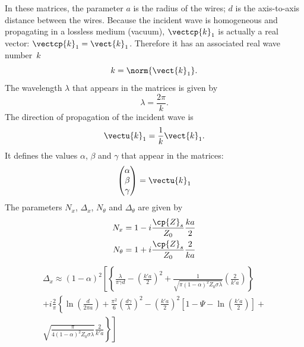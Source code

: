 In these matrices, the parameter $a$ is the radius of the wires;
$d$ is the axis-to-axis distance between the wires.
Because the incident wave is homogeneous and propagating in a lossless medium (vacuum), $\vectcp{k}_1$ is actually a real vector: $\vectcp{k}_1 = \vect{k}_1$.
Therefore it has an associated real wave number~$k$
\begin{equation}
    k = \norm{\vect{k}_1}\text{.}
\end{equation}
The wavelength $\lambda$ that appears in the matrices is given by
\begin{equation}
    \lambda = \frac{2 \pi}{k}
    \text{.}
\end{equation}
The direction of propagation of the incident wave is
\begin{equation}
    \vectu{k}_1 = \frac{1}{k} \vect{k}_1
    \text{.}
\end{equation}
It defines the values $\alpha$, $\beta$ and $\gamma$ that appear in the matrices:
\begin{equation}
    \begin{pmatrix}
    \alpha \\ \beta \\ \gamma
    \end{pmatrix}
    =
    \vectu{k}_1
\end{equation}
The parameters $N_x$, $\Delta_x$, $N_\theta$ and $\Delta_\theta$ are given by
\begin{align}
    N_x
    &=
    1 - i \frac{\cp{Z}_s}{Z_0} \frac{ka}{2}
    \\
    N_\theta
    &=
    1 + i \frac{\cp{Z}_s}{Z_0} \frac{2}{ka}
\end{align}
\begin{multline}
    \Delta_x \approx
    (1-\alpha)^2
    \left[
        \left\lbrace
            \frac{\lambda}{\pi \gamma d}
            -
            \left(
                \frac{k'a}{2}
            \right)^2
            +
            \frac{
                1
            }{
                \sqrt{
                    \pi
                    (1 - \alpha)^2
                    Z_0
                    \sigma
                    \lambda
                }
            }
            \left(
                \frac{2}{k'a}
            \right)
        \right\rbrace
    \right.
    \\
        +i \frac{2}{\pi}
        \left\lbrace
            \ln \left( \frac{d}{2\pi a} \right)
            +
            \frac{\pi^2}{6}
            \left(
                \frac{d \gamma}{\lambda}
            \right)^2
            -
            \left(
                \frac{k'a}{2}
            \right)^2
            \left[
                1 - \Psi - \ln\left( \frac{k'a}{2} \right)
            \right]
        \right.
            +
    \\
    \left.
        \left.
            \sqrt{
                \frac{\pi}{
                    4
                    (1-\alpha)^2
                    Z_0
                    \sigma
                    \lambda
                }
            }
            \frac{2}{k'a}
        \right\rbrace
    \right]
\end{multline}
